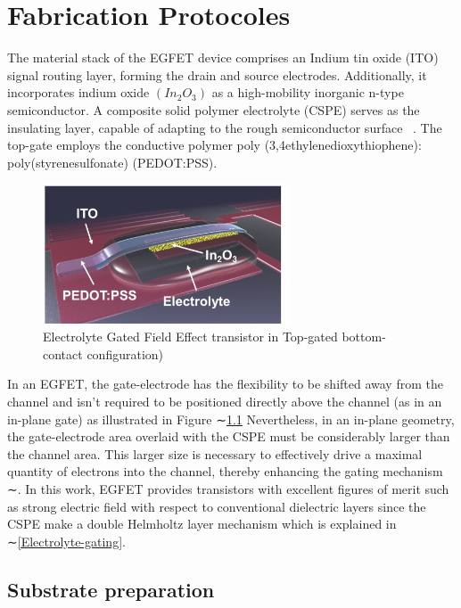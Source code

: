 
\chapter{Fabrication Protocoles}\label{Fabrication Protocoles}




The material stack of the EGFET device comprises an Indium tin oxide (ITO) signal routing layer, forming the drain and source electrodes. Additionally, it incorporates indium oxide $(In_2O_3)$ as a high-mobility inorganic n-type semiconductor. A composite solid polymer electrolyte (CSPE) serves as the insulating layer, capable of adapting to the rough semiconductor surface ~\cite{ref73}. The top-gate employs the conductive polymer poly (3,4ethylenedioxythiophene): poly(styrenesulfonate) (PEDOT:PSS).
 \begin{figure}[h!]
\centering
\includegraphics[width=0.65\textwidth]{figures/fig14.png}
\caption[Example of caption.]{Electrolyte Gated Field Effect transistor in Top-gated bottom-contact configuration) \label{fig14}}
\end{figure}

In an EGFET, the gate-electrode has the flexibility to be shifted away from the channel and isn't required to be positioned directly above the channel (as in an in-plane gate) as illustrated in Figure ∼\ref{fig14} Nevertheless, in an in-plane geometry, the gate-electrode area overlaid with the CSPE must be considerably larger than the channel area. This larger size is necessary to effectively drive a maximal quantity of electrons into the channel, thereby enhancing the gating mechanism ∼\cite{ref17}.
In this work, EGFET provides transistors with excellent figures of merit such as strong electric field with respect to conventional dielectric layers since the CSPE make a double Helmholtz layer mechanism which is explained in ∼\ref{Electrolyte-gating}.



\section {Substrate preparation}
\label{Substrate preparation}

